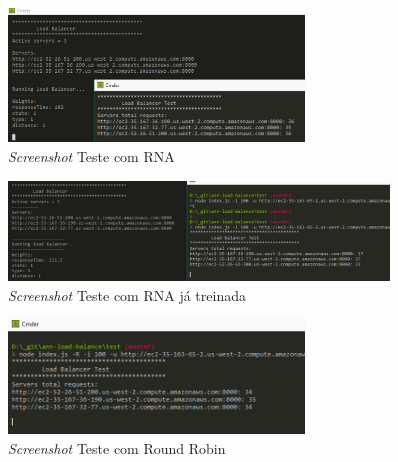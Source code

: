 \begin{figure}[htb]
	\caption{\label{fig:resultann} \textit{Screenshot} Teste com RNA}
	\begin{center}
		\includegraphics[width=0.70\textwidth]{img/resquisicao-ann.png}
	\end{center}
\end{figure}
\begin{figure}[htb]
	\caption{\label{fig:resultann2} \textit{Screenshot} Teste com RNA já treinada}
	\begin{center}
		\includegraphics[width=0.90\textwidth]{img/resquisicao-ann-second.png}
	\end{center}
\end{figure}

\vspace{-10cm}

\begin{figure}[htb]
	\caption{\label{fig:resultrr} \textit{Screenshot} Teste com Round Robin}
	\begin{center}
		\includegraphics[width=0.70\textwidth]{img/resquisicao-round.png}
	\end{center}
\end{figure}
